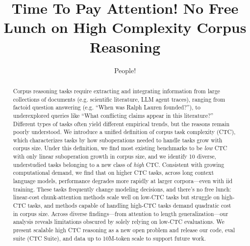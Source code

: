\documentclass{article} %
\title{Time To Pay Attention! No Free Lunch on High Complexity Corpus Reasoning}
\author{People!}
\newcommand{\bench}{CTC Suite}
\begin{document}
\maketitle



\begin{abstract}






Corpus reasoning tasks require extracting and integrating information from large collections of documents (e.g. scientific literature, LLM agent traces), ranging from factoid question answering (e.g. “When was Ralph Lauren founded?”), to underexplored queries like “What conflicting claims appear in this literature?” Different types of tasks often yield different empirical trends, but the reasons remain poorly understood. We introduce a unified definition of corpus task complexity (CTC), which characterizes tasks by how suboperations needed to handle tasks grow with corpus size. Under this definition, we find most existing benchmarks to be \emph{low} CTC with only linear suboperation growth in corpus size, and we identify 10 diverse, understudied tasks belonging to a new class of \emph{high} CTC. Consistent with growing computational demand, we find that on higher CTC tasks, across long context language models, performance degrades more rapidly at larger corpora—even with iid training. These tasks frequently change modeling decisions, and there’s no free lunch: linear-cost chunk-attention methods scale well on low-CTC tasks but struggle on high-CTC tasks, and methods capable of handling high-CTC tasks demand quadratic cost in corpus size. Across diverse findings---from attention to  length generalization---our analysis reveals limitations obscured by solely relying on low-CTC evaluations. We present scalable high CTC reasoning as a new open problem and release our code, eval suite (\bench), and data up to 10M-token scale to support future work.



\end{abstract}
\end{document}
